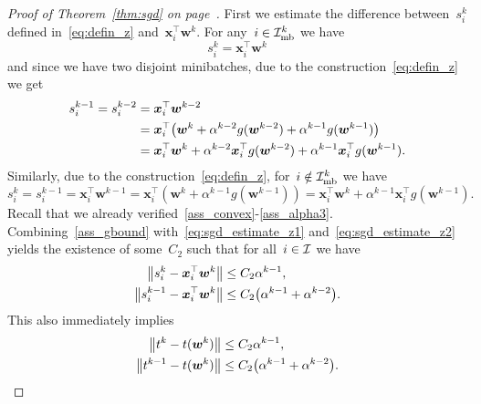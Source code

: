 \begin{proof}[Proof of Theorem~\ref{thm:sgd} on page~\pageref{thm:sgd}]
  First we estimate the difference between~$s_i^k$ defined in~\eqref{eq:defin_z} and~$\bm{x}_i^\top \bm{w}^k$. For any~$i \in \mathcal{I}_{\text{mb}}^k$ we have
  \begin{equation*}
    s_i^k = \bm{x}_i^\top \bm{w}^k
  \end{equation*}
  and since we have two disjoint minibatches, due to the construction~\eqref{eq:defin_z} we get
  \begin{equation}\label{eq:sgd_estimate_z1}
    \begin{aligned}
      s_i^{k-1}
          = s_i^{k-2}
        & = \bm{x}_i^\top \bm{w}^{k-2} \\
        & = \bm{x}_i^\top \Brac{\bm{w}^k + \alpha^{k-2}g(\bm{w}^{k-2}) + \alpha^{k-1} g(\bm{w}^{k-1})} \\
        & = \bm{x}_i^\top \bm{w}^k + \alpha^{k-2}\bm{x}_i^\top g(\bm{w}^{k-2}) + \alpha^{k-1}\bm{x}_i^\top g(\bm{w}^{k-1}).
    \end{aligned}
  \end{equation}
  Similarly, due to the construction~\eqref{eq:defin_z}, for~$i \notin \mathcal{I}_{\text{mb}}^k$ we have
  \begin{equation}\label{eq:sgd_estimate_z2}
    s_i^k
    = s_i^{k-1}
    = \bm{x}_i^\top \bm{w}^{k-1}
    = \bm{x}_i^\top (\bm{w}^k+\alpha^{k-1}g(\bm{w}^{k-1}))
    = \bm{x}_i^\top \bm{w}^k + \alpha^{k-1}\bm{x}_i^\top g(\bm{w}^{k-1}).
  \end{equation}
  Recall that we already verified~\ref{ass_convex}-\ref{ass_alpha3}. Combining~\ref{ass_gbound} with~\eqref{eq:sgd_estimate_z1} and~\eqref{eq:sgd_estimate_z2} yields the existence of some~$C_2$ such that for all~$i \in \mathcal{I}$ we have
  \begin{equation}\label{eq:estimate_diff_z}
    \begin{aligned}
      \norm{s_i^k - \bm{x}_i^\top \bm{w}^k} &\leq C_2\alpha^{k-1}, \\
      \norm{s_i^{k-1} - \bm{x}_i^\top \bm{w}^k} &\leq C_2\Brac{\alpha^{k-1}+\alpha^{k-2}}. \\
    \end{aligned}
  \end{equation}
  This also immediately implies
  \begin{equation}\label{eq:estimate_diff_t}
    \begin{aligned}
      \norm{t^k - t(\bm{w}^k)}     & \leq C_2\alpha^{k-1}, \\
      \norm{t^{k-1} - t(\bm{w}^k)} & \leq C_2\Brac{\alpha^{k-1}+\alpha^{k-2}}. \\
    \end{aligned}

\end{equation}
\end{proof}
